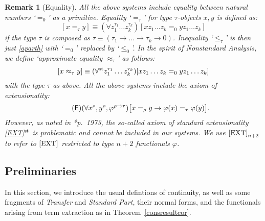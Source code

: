 \documentclass[reqno]{amsart}
\newtheorem{rem}[thm]{Remark}
\newcommand\be{\begin{equation}}
\newcommand\ee{\end{equation}}
\def\st{\textup{st}}
\def\di{\rightarrow}
\def\QFAC{\textup{\textsf{QF-AC}}}
\def\CI{{\mathfrak{CI}}}
\def\IST{\textup{\textsf{IST}}}
\numberwithin{equation}{section}
\numberwithin{thm}{section}
\begin{document}
\begin{rem}[Equality]\label{equ}\rm
All the above systems include equality between natural numbers `$=_{0}$' as a primitive.  Equality `$=_{\tau}$' for type $\tau$-objects $x,y$ is defined as:
\be\label{aparth}
[x=_{\tau}y] \equiv (\forall z_{1}^{\tau_{1}}\dots z_{k}^{\tau_{k}})[xz_{1}\dots z_{k}=_{0}yz_{1}\dots z_{k}]
\ee
if the type $\tau$ is composed as $\tau\equiv(\tau_{1}\di \dots\di \tau_{k}\di 0)$.  Inequality `$\leq_{\tau}$' is then just \eqref{aparth} with `$=_{0}$' replaced by `$\leq_{0}$'.  
In the spirit of Nonstandard Analysis, we define `approximate equality $\approx_{\tau}$' as follows:
\be\label{aparth2}
[x\approx_{\tau}y] \equiv (\forall^{\st} z_{1}^{\tau_{1}}\dots z_{k}^{\tau_{k}})[xz_{1}\dots z_{k}=_{0}yz_{1}\dots z_{k}]
\ee
with the type $\tau$ as above.  
All the above systems include the \emph{axiom of extensionality}:%
\be\label{EXT}\tag{\textsf{E}}  
(\forall  x^{\rho},y^{\rho},\varphi^{\rho\di \tau}) \big[x=_{\rho} y \di \varphi(x)=_{\tau}\varphi(y)   \big].
\ee
However, as noted in \cite{brie}*{p.\ 1973}, the so-called axiom of \emph{standard} extensionality \eqref{EXT}$^{\st}$ is problematic and cannot be included in our systems.  
We use $\eqref{EXT}_{n+2}$ to refer to $\eqref{EXT}$ restricted to type $n+2$ functionals $\varphi$.  
\end{rem}


\subsection{Preliminaries}\label{preint}
In this section, we introduce the usual defintions of continuity, as well as some fragments of \emph{Transfer} and \emph{Standard Part}, their normal forms, and the functionals arising from term extraction as in Theorem~\ref{consresultcor}.  %
\end{document}
